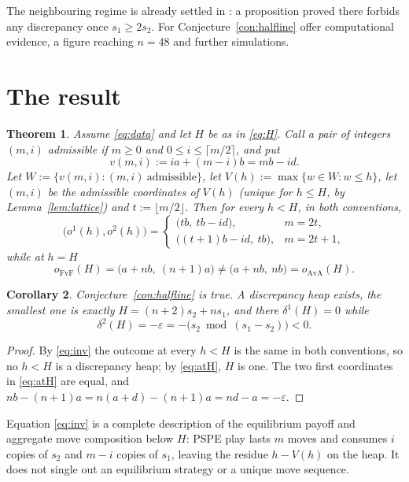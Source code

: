 \documentclass[11pt]{amsart}
\newtheorem{theorem}{Theorem}
\newtheorem{corollary}[theorem]{Corollary}
\theoremstyle{definition}
\theoremstyle{remark}
\DeclareMathOperator{\FvF}{FvF}
\DeclareMathOperator{\AvA}{AvA}
\begin{document}
The neighbouring regime is already settled in \cite{BKLM}: a proposition proved
there forbids any discrepancy once $s_1\ge2s_2$. For
Conjecture~\ref{con:halfline} \cite{BKLM} offer computational evidence, a figure
reaching $n=48$ and further simulations.

\section{The result}

\begin{theorem}\label{thm:main}
Assume \eqref{eq:data} and let $H$ be as in \eqref{eq:H}. Call a pair of
integers $(m,i)$ \emph{admissible} if $m\ge0$ and $0\le i\le\lceil m/2\rceil$,
and put
\[
  v(m,i):=ia+(m-i)b=mb-id .
\]
Let $W:=\{v(m,i):(m,i)\ \text{admissible}\}$, let
$V(h):=\max\{w\in W:w\le h\}$, let $(m,i)$ be the admissible coordinates of
$V(h)$ \textup{(}unique for $h\le H$, by Lemma~\textup{\ref{lem:lattice}}\/\textup{)}
and $t:=\lfloor m/2\rfloor$. Then for every $h<H$, in \emph{both}
conventions,
\begin{equation}\label{eq:inv}
  \bigl(o^1(h),o^2(h)\bigr)=
  \begin{cases}
    \bigl(tb,\ tb-id\bigr), & m=2t,\\[2pt]
    \bigl((t+1)b-id,\ tb\bigr), & m=2t+1,
  \end{cases}
\end{equation}
while at $h=H$
\begin{equation}\label{eq:atH}
  o_{\FvF}(H)=\bigl(a+nb,\ (n+1)a\bigr)
  \neq
  \bigl(a+nb,\ nb\bigr)=o_{\AvA}(H).
\end{equation}
\end{theorem}

\begin{corollary}\label{cor:conj}
Conjecture~\ref{con:halfline} is true. A discrepancy heap exists, the smallest
one is exactly $H=(n+2)s_2+ns_1$, and there
$\delta^1(H)=0$ while
\[
  \delta^2(H)=-\varepsilon=-\bigl(s_2\bmod(s_1-s_2)\bigr)<0 .
\]
\end{corollary}

\begin{proof}
By \eqref{eq:inv} the outcome at every $h<H$ is the same in both conventions,
so no $h<H$ is a discrepancy heap; by \eqref{eq:atH}, $H$ is one. The two
first coordinates in \eqref{eq:atH} are equal, and
$nb-(n+1)a=n(a+d)-(n+1)a=nd-a=-\varepsilon$.
\end{proof}

Equation \eqref{eq:inv} is a complete description of the equilibrium payoff and
aggregate move composition below $H$: PSPE play lasts $m$ moves and consumes $i$
copies of $s_2$ and $m-i$ copies of $s_1$, leaving the residue $h-V(h)$ on the
heap. It does not single out an equilibrium strategy or a unique move sequence.
\end{document}
